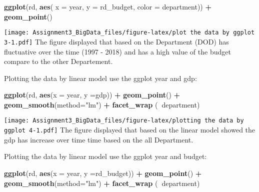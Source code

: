 \documentclass[]{article}
\newenvironment{Shaded}{\begin{snugshade}}{\end{snugshade}}
\newcommand{\KeywordTok}[1]{\textcolor[rgb]{0.13,0.29,0.53}{\textbf{#1}}}
\newcommand{\DataTypeTok}[1]{\textcolor[rgb]{0.13,0.29,0.53}{#1}}
\newcommand{\StringTok}[1]{\textcolor[rgb]{0.31,0.60,0.02}{#1}}
\newcommand{\OperatorTok}[1]{\textcolor[rgb]{0.81,0.36,0.00}{\textbf{#1}}}
\newcommand{\NormalTok}[1]{#1}
\begin{document}
\begin{Shaded}
\begin{Highlighting}[]
\KeywordTok{ggplot}\NormalTok{(rd, }\KeywordTok{aes}\NormalTok{( }\DataTypeTok{x =}\NormalTok{ year, }\DataTypeTok{y =}\NormalTok{ rd_budget, }\DataTypeTok{color =}\NormalTok{ department)) }\OperatorTok{+}
\StringTok{  }\KeywordTok{geom_point}\NormalTok{()}
\end{Highlighting}
\end{Shaded}

\texttt{[image: Assignment3\_BigData\_files/figure-latex/plot the data by ggplot 3-1.pdf]}
The figure displayed that based on the Department (DOD) has fluctuative
over the time (1997 - 2018) and has a high value of the budget compare
to the other Departement.

Plotting the data by linear model use the ggplot year and gdp:

\begin{Shaded}
\begin{Highlighting}[]
\KeywordTok{ggplot}\NormalTok{(rd, }\KeywordTok{aes}\NormalTok{(}\DataTypeTok{x =}\NormalTok{ year, }\DataTypeTok{y =}\NormalTok{gdp)) }\OperatorTok{+}
\StringTok{  }\KeywordTok{geom_point}\NormalTok{() }\OperatorTok{+}\StringTok{ }\KeywordTok{geom_smooth}\NormalTok{(}\DataTypeTok{method=}\StringTok{"lm"}\NormalTok{) }\OperatorTok{+}\StringTok{ }\KeywordTok{facet_wrap}\NormalTok{ (}\OperatorTok{~}\NormalTok{department)}
\end{Highlighting}
\end{Shaded}

\texttt{[image: Assignment3\_BigData\_files/figure-latex/plotting the data by ggplot 4-1.pdf]}
The figure displayed that based on the linear model showed the gdp has
increase over time time based on the all Department.

Plotting the data by linear model use the ggplot year and budget:

\begin{Shaded}
\begin{Highlighting}[]
\KeywordTok{ggplot}\NormalTok{(rd, }\KeywordTok{aes}\NormalTok{(}\DataTypeTok{x =}\NormalTok{ year, }\DataTypeTok{y =}\NormalTok{rd_budget)) }\OperatorTok{+}
\StringTok{  }\KeywordTok{geom_point}\NormalTok{() }\OperatorTok{+}\StringTok{ }\KeywordTok{geom_smooth}\NormalTok{(}\DataTypeTok{method=}\StringTok{"lm"}\NormalTok{) }\OperatorTok{+}\StringTok{ }\KeywordTok{facet_wrap}\NormalTok{ (}\OperatorTok{~}\NormalTok{department)}
\end{Highlighting}
\end{Shaded}
\end{document}
